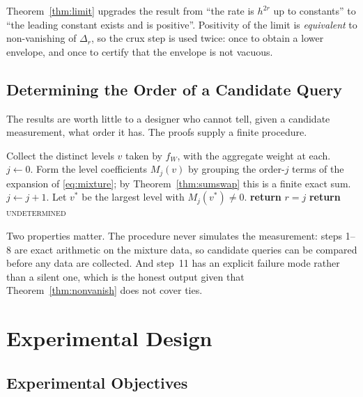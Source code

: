 Theorem~\ref{thm:limit} upgrades the result from ``the rate is $h^{2r}$ up to constants'' to
``the leading constant exists and is positive''. Positivity of the limit is \emph{equivalent}
to non-vanishing of $\Delta_{r}$, so the crux step is used twice: once to obtain a lower
envelope, and once to certify that the envelope is not vacuous.

\subsection{Determining the Order of a Candidate Query}
\label{sec:procedure}

The results are worth little to a designer who cannot tell, given a candidate measurement,
what order it has. The proofs supply a finite procedure.

\begin{algorithm}[htbp]
\caption{Leakage order of a candidate measurement}
\label{alg:order}
\begin{algorithmic}[1]
\STATE Collect the distinct levels $v$ taken by $f_{W}$, with the aggregate weight at each.
\STATE $j\leftarrow0$.
\REPEAT
  \STATE Form the level coefficients $M_{j}(v)$ by grouping the order-$j$ terms of the
         expansion of \eqref{eq:mixture}; by Theorem~\ref{thm:sumswap} this is a finite
         exact sum.
    \STATE $j\leftarrow j+1$.
  \ENDIF
{}
\STATE Let $v^{*}$ be the largest level with $M_{j}(v^{*})\neq0$.
  \STATE \textbf{return} $r=j$ 
\ELSE
  \STATE \textbf{return} \textsc{undetermined} 
\ENDIF
\end{algorithmic}
\end{algorithm}

Two properties matter. The procedure never simulates the measurement: steps 1--8 are exact
arithmetic on the mixture data, so candidate queries can be compared before any data are
collected. And step~11 has an explicit failure mode rather than a silent one, which is the
honest output given that Theorem~\ref{thm:nonvanish} does not cover ties.

\section{Experimental Design}
\label{sec:expdesign}

\subsection{Experimental Objectives}

